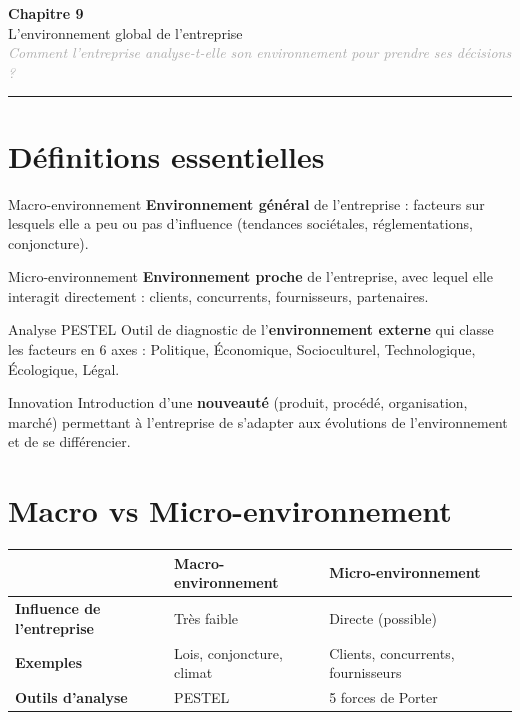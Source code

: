 \documentclass[11pt,a4paper]{article}
\begin{document}
\begin{center}
  {\Large\bfseries\textcolor{mainColor}{Chapitre 9}}\\[2pt]
  {\large L'environnement global de l'entreprise}\\[4pt]
  \textit{\textcolor{darkGray}{Comment l'entreprise analyse-t-elle son environnement pour prendre ses décisions ?}}
\end{center}
\vspace{4pt}\hrule\vspace{8pt}

\section*{Définitions essentielles}

\begin{defbox}{Macro-environnement}
\textbf{Environnement général} de l'entreprise : facteurs sur lesquels elle a peu ou pas d'influence (tendances sociétales, réglementations, conjoncture).
\end{defbox}

\vspace{4pt}
\begin{defbox}{Micro-environnement}
\textbf{Environnement proche} de l'entreprise, avec lequel elle interagit directement : clients, concurrents, fournisseurs, partenaires.
\end{defbox}

\vspace{4pt}
\begin{defbox}{Analyse PESTEL}
Outil de diagnostic de l'\textbf{environnement externe} qui classe les facteurs en 6 axes : Politique, Économique, Socioculturel, Technologique, Écologique, Légal.
\end{defbox}

\vspace{4pt}
\begin{defbox}{Innovation}
Introduction d'une \textbf{nouveauté} (produit, procédé, organisation, marché) permettant à l'entreprise de s'adapter aux évolutions de l'environnement et de se différencier.
\end{defbox}

\section*{Macro vs Micro-environnement}

\begin{center}
\begin{tabular}{|l|l|l|}
\hline
 & \textbf{Macro-environnement} & \textbf{Micro-environnement} \\
\hline
\textbf{Influence de l'entreprise} & Très faible & Directe (possible) \\
\textbf{Exemples} & Lois, conjoncture, climat & Clients, concurrents, fournisseurs \\
\textbf{Outils d'analyse} & PESTEL & 5 forces de Porter \\
\hline
\end{tabular}
\end{center}
\end{document}
